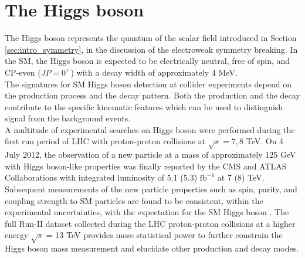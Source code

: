 \section{\label{intro_Higgs}The Higgs boson}
\noindent The Higgs boson represents the quantum of the scalar field introduced in Section \ref{sec:intro_symmetry}, in the discussion of the electroweak symmetry breaking. In the SM, the Higgs boson is expected to be electrically neutral, free of spin, and CP-even ($\mathit{JP} = 0^+$) with a decay width of approximately 4 MeV. \\
\indent The signatures for SM Higgs boson detection at collider experiments depend on the production process and the decay pattern. Both the production and the decay contribute to the specific kinematic features which can be used to distinguish signal from the background events.\\
\indent A multitude of experimental searches on Higgs boson were performed during the first run period of LHC with proton-proton collisions at $\sqrt{s} = 7, 8$ TeV. On 4 July 2012, the observation of a new particle at a mass of approximately 125 GeV with Higgs boson-like properties was finally reported by the CMS \cite{Higgs1} and ATLAS \cite{Higgs2} Collaborations with integrated luminosity of 5.1 (5.3) $\text{fb}^{-1}$ at 7 (8) TeV. Subsequent measurements of the new particle properties such as spin, parity, and coupling strength to SM particles are found to be consistent, within the experimental uncertainties, with the expectation for the SM Higgs boson \cite{Aad2016, Khachatryan2015, 2013120, PhysRevD.92.012004}. The full Run-II dataset collected during the LHC proton-proton collisions at a higher energy $\sqrt{s}$ = 13 TeV provides more statistical power to further constrain the Higgs boson mass measurement and elucidate other production and decay modes.
